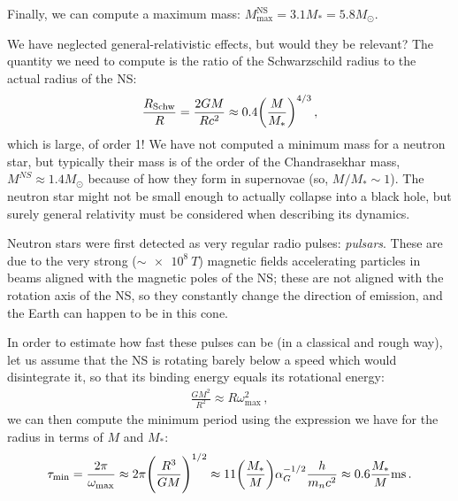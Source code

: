 \documentclass[main.tex]{subfiles}
\begin{document}
Finally, we can compute a maximum mass: \(M _{\text{max}}^{\text{NS}} = 3.1 M_{*} = 5.8 M_{\odot}\). 

We have neglected general-relativistic effects, but would they be relevant? The quantity we need to compute is the ratio of the Schwarzschild radius to the actual radius of the NS:
%
\begin{align}
\frac{R_{\text{Schw}}}{R} =
\frac{2GM}{Rc^2} \approx \num{.4} \qty(\frac{M}{M_{*}})^{4/3}
\,,
\end{align}
%
which is large, of order 1! We have not computed a minimum mass for a neutron star, but typically their mass is of the order of the Chandrasekhar mass, \(M^{NS} \approx 1.4 M_{\odot}\) because of how they form in supernovae (so, \(M / M_{*} \sim 1\)).
The neutron star might not be small enough to actually collapse into a black hole, but surely general relativity must be considered when describing its dynamics.

Neutron stars were first detected as very regular radio pulses: \emph{pulsars}. These are due to the very strong (\(\sim \SI{e8}{T}\)) magnetic fields accelerating particles in beams aligned with the magnetic poles of the NS; these are not aligned with the rotation axis of the NS, so they constantly change the direction of emission, and the Earth can happen to be in this cone. 

In order to estimate how fast these pulses can be (in a classical and rough way), let us assume that the NS is rotating barely below a speed which would disintegrate it, so that its binding energy equals its rotational energy:
%
\begin{align}
\frac{GM^2}{R^2} \approx R \omega^2 _{\text{max}}
\,,
\end{align}
%
we can then compute the minimum period using the expression we have for the radius in terms of \(M\) and \(M_{*}\):
%
\begin{align}
\tau _{\text{min}} = \frac{2 \pi }{\omega _{\text{max}}} 
\approx 2 \pi \qty(\frac{R^3}{GM})^{1/2}
\approx 
11 \qty(\frac{M_{*}}{M}) \alpha_{G}^{-1/2} \frac{h}{m_n c^2}
\approx \num{.6} \frac{M_{*}}{M} \SI{}{ms}
\,.
\end{align}
\end{document}
